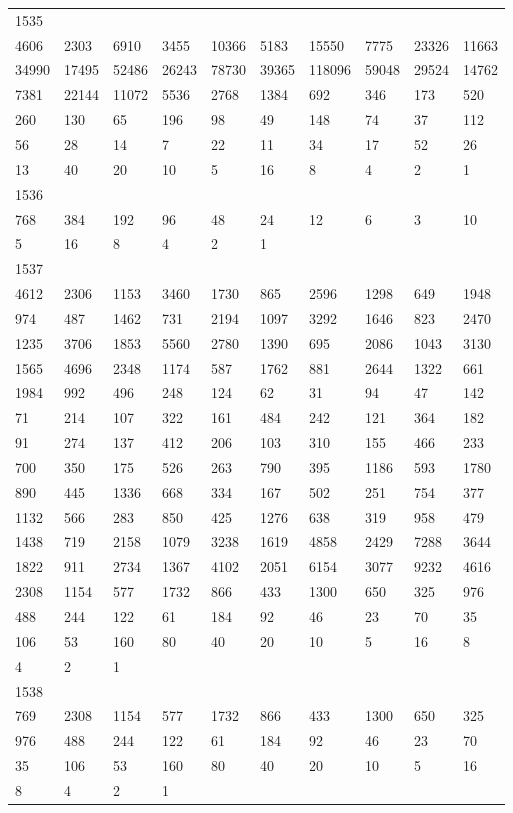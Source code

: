\begin{longtable}{*{10}{l}}
1535&&&&&&&&&\\
4606& 2303& 6910& 3455& 10366& 5183& 15550& 7775& 23326& 11663\\
34990& 17495& 52486& 26243& 78730& 39365& 118096& 59048& 29524& 14762\\
7381& 22144& 11072& 5536& 2768& 1384& 692& 346& 173& 520\\
260& 130& 65& 196& 98& 49& 148& 74& 37& 112\\
56& 28& 14& 7& 22& 11& 34& 17& 52& 26\\
13& 40& 20& 10& 5& 16& 8& 4& 2& 1\\

1536&&&&&&&&&\\
768& 384& 192& 96& 48& 24& 12& 6& 3& 10\\
5& 16& 8& 4& 2& 1& \\

1537&&&&&&&&&\\
4612& 2306& 1153& 3460& 1730& 865& 2596& 1298& 649& 1948\\
974& 487& 1462& 731& 2194& 1097& 3292& 1646& 823& 2470\\
1235& 3706& 1853& 5560& 2780& 1390& 695& 2086& 1043& 3130\\
1565& 4696& 2348& 1174& 587& 1762& 881& 2644& 1322& 661\\
1984& 992& 496& 248& 124& 62& 31& 94& 47& 142\\
71& 214& 107& 322& 161& 484& 242& 121& 364& 182\\
91& 274& 137& 412& 206& 103& 310& 155& 466& 233\\
700& 350& 175& 526& 263& 790& 395& 1186& 593& 1780\\
890& 445& 1336& 668& 334& 167& 502& 251& 754& 377\\
1132& 566& 283& 850& 425& 1276& 638& 319& 958& 479\\
1438& 719& 2158& 1079& 3238& 1619& 4858& 2429& 7288& 3644\\
1822& 911& 2734& 1367& 4102& 2051& 6154& 3077& 9232& 4616\\
2308& 1154& 577& 1732& 866& 433& 1300& 650& 325& 976\\
488& 244& 122& 61& 184& 92& 46& 23& 70& 35\\
106& 53& 160& 80& 40& 20& 10& 5& 16& 8\\
4& 2& 1& \\

1538&&&&&&&&&\\
769& 2308& 1154& 577& 1732& 866& 433& 1300& 650& 325\\
976& 488& 244& 122& 61& 184& 92& 46& 23& 70\\
35& 106& 53& 160& 80& 40& 20& 10& 5& 16\\
8& 4& 2& 1& \\


\end{longtable}
